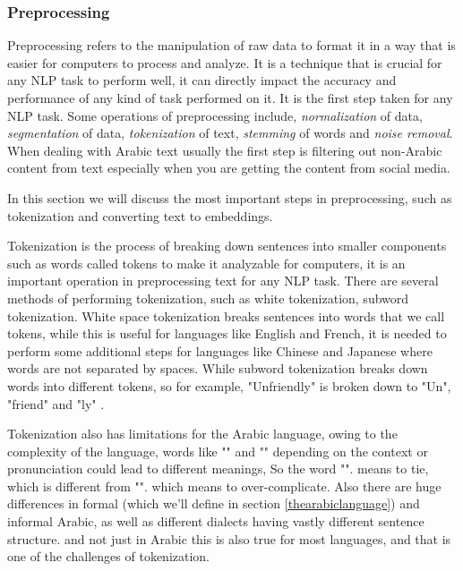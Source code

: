 \documentclass[12pt]{diazessay}
\newcounter{subsubsubsection}[subsubsection]
\begin{document}
        
        \subsubsection{Preprocessing}
            Preprocessing refers to the manipulation of raw data to format it in a way that is easier for computers to process and analyze. It is a technique that is crucial for any NLP task to perform well, it can directly impact the accuracy and performance of any kind of task performed on it. It is the first step taken for any NLP task. Some operations of preprocessing include, \emph{normalization} of data, \emph{segmentation} of data, \emph{tokenization} of text, \emph{stemming} of words and \emph{noise removal}. When dealing with Arabic text usually the first step is filtering out non-Arabic content from text especially when you are getting the content from social media.
            
            In this section we will discuss the most important steps in preprocessing, such as tokenization and converting text to embeddings.


            Tokenization is the process of breaking down sentences into smaller components such as words called tokens to make it analyzable for computers, it is an important operation in preprocessing text for any NLP task. There are several methods of performing tokenization, such as white tokenization, subword tokenization. White space tokenization breaks sentences into words that we call tokens, while this is useful for languages like English and French, it is needed to perform some additional steps for languages like Chinese and Japanese where words are not separated by spaces. While subword tokenization breaks down words into different tokens, so for example, "Unfriendly" is broken down to "Un", "friend" and "ly" \cite{subword_tokenization}.
            
            Tokenization also has limitations for the Arabic language, owing to the complexity of the language, words like "" and "" depending on the context or pronunciation could lead to different meanings, So the word
            "".
            means to tie, which is different from
            "".
            which means to over-complicate.
            Also there are huge differences in formal (which we'll define in section \ref{thearabiclanguage}) and informal Arabic, as well as different dialects having vastly different sentence structure. and not just in Arabic this is also true for most languages, and that is one of the challenges of tokenization.
    
\end{document}
